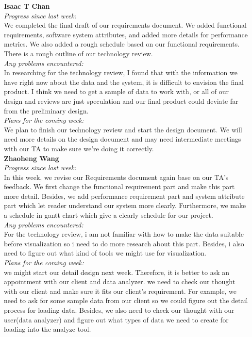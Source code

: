\noindent\textbf{Isaac T Chan}\\
\noindent\textit{Progress since last week:}\\
We completed the final draft of our requirements document. We added functional requirements, software system attributes, and added more details for performance metrics. We also added a rough schedule based on our functional requirements. There is a rough outline of our technology review.\\

\noindent\textit{Any problems encountered:}\\
In researching for the technology review, I found that with the information we have right now about the data and the system, it is difficult to envision the final product. I think we need to get a sample of data to work with, or all of our design and reviews are just speculation and our final product could deviate far from the preliminary design.\\

\noindent\textit{Plans for the coming week:}\\
We plan to finish our technology review and start the design document. We will need more details on the design document and may need intermediate meetings with our TA to make sure we're doing it correctly.\\

\noindent\textbf{Zhaoheng Wang}\\
\noindent\textit{Progress since last week:}\\
In this week, we revise our Requirements document again base on our TA's feedback. We first change the functional requirement part and make this part more detail. Besides, we add performance requirement part and system attribute part which let reader understand our system more clearly. Furthermore, we make a schedule in gantt chart which give a clearly schedule for our project.\\

\noindent\textit{Any problems encountered:}\\
For the technology review, i am not familiar with how to make the data suitable before visualization so i need to do more research about this part. Besides, i also need to figure out what kind of tools we might use for visualization.\\

\noindent\textit{Plans for the coming week:}\\
we might start our detail design next week. Therefore, it is better to ask an appointment with our client and data analyzer. we need to check our thought with our client and make sure it fits our client's requirement. For example, we need to ask for some sample data from our client so we could figure out the detail process for loading data. Besides, we also need to check our thought with our user(data analyzer) and figure out what types of data we need to create for loading into the analyze tool.\\


